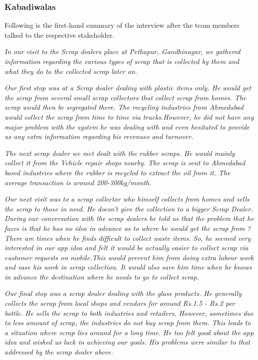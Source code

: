 \documentclass{article}
\begin{document}
\subsubsection{Kabadiwalas}
\par Following is the first-hand summary of the interview after the team members talked to the respective stakeholder.
\par \textit{ In our visit to the Scrap dealers place at Pethapur, Gandhinagar, we gathered information regarding the various types of scrap that is collected by them and what they do to the collected scrap later on.}
\par \textit{Our first stop was at a Scrap dealer dealing with plastic items only. He would get the scrap from several small scrap collectors that collect scrap from homes. The scrap would then be segregated there. The recycling industries from Ahmedabad would collect the scrap from time to time via trucks.However, he did not have any major problem with the system he was dealing with and even hesitated to provide us any extra information regarding his revenues and turnover.}
\par \textit{The next scrap dealer we met dealt with the rubber scraps. He would mainly collect it from the Vehicle repair shops nearby. The scrap is sent to Ahmedabad based industries where the rubber is recycled to extract the oil from it. The average transaction is around 200-300kg/month. }
\par \textit{Our next visit was to a scrap collector who himself collects from homes and sells the scrap to those in need. He doesn't give the collection to a bigger Scrap Dealer. During our conversation with the scrap dealers he told us that the problem that he faces is that he has no idea in advance as to where he would get the scrap from ? There are times when he finds difficult to collect waste items. So, he seemed very interested in our app idea and felt it would be actually easier to collect scrap via customer requests on mobile.This would prevent him from doing extra labour work and ease his work in scrap collection. It would also save him time when he knows in advance the destination where he needs to go to collect scrap.}
\par \textit{Our final stop was a scrap dealer dealing with the glass products. He generally collects the scrap from local shops and vendors for around Rs.1.5 - Rs.2 per bottle. He sells the scrap to both industries and retailers. However, sometimes due to less amount of scrap, the industries do not buy scrap from them. This leads to a situation where scrap lies around for a long time. He too felt good about the app idea and wished us luck in achieving our goals. His problems were similar to that addressed by the scrap dealer above.}
\end{document}
